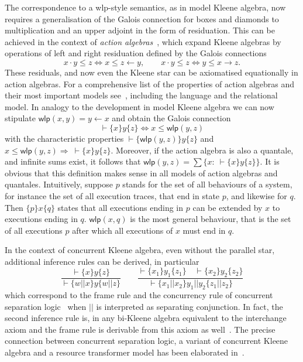 \documentclass{llncs}
\newcommand{\wlp}{\mathsf{wlp}}
\begin{document}
The correspondence to a wlp-style semantics, as in model Kleene
algebra, now requires a generalisation of the Galois connection for
boxes and diamonds to multiplication and an upper adjoint in the form
of residuation.  This can be achieved in the context of \emph{action
  algebras}~\cite{pratt_action_1990}, which expand Kleene algebras by operations
of left and right residuation defined by the Galois connections
\begin{equation*}
  x\cdot y\le z\Leftrightarrow x\le z\leftarrow y,\qquad x\cdot y\le z \Leftrightarrow y\le x\rightarrow z.
\end{equation*}
These residuals, and now even the Kleene star can be axiomatised
equationally in action algebras. For a comprehensive list of the
properties of action algebras and their most important models
see~\cite{armstrong_kleene_2013}, including the language and the relational
model. In analogy to the development in model Kleene algebra we can
now stipulate $ \wlp(x,y)=y\leftarrow x$ and obtain the Galois
connection
\begin{equation*}
  \vdash \{x\}y\{z\} \Leftrightarrow x\le \wlp(y,z)
\end{equation*}
with the characteristic properties $\vdash \{\wlp(y,z)\}y\{z\}$ and $x\le
\wlp(y,z)\Rightarrow \ \vdash \{x\}y\{z\}$. Moreover, if the action algebra is
also a quantale, and infinite sums exist, it follows that $
\wlp(y,z)=\sum\{x:\ \vdash \{x\}y\{z\}\}$.  It is obvious that this definition
makes sense in all models of action algebras and
quantales. Intuitively, suppose $p$ stands for the set of all
behaviours of a system, for instance the set of all execution traces,
that end in state $p$, and likewise for $q$. Then $\{p\}x\{q\}$ states
that all executions ending in $p$ can be extended by $x$ to executions
ending in $q$. $\wlp(x,q)$ is the most general behaviour, that is the
set of all executions $p$ after which all executions of $x$ must end
in $q$.

In the context of concurrent Kleene algebra, even without the parallel
star, additional inference rules can be derived, in particular
\begin{equation*}
  \frac{\vdash\{x\}y\{z\}}{\vdash\{w||x\}y\{w||z\}}\qquad \frac{\vdash\{x_1\}y_1\{z_1\}\quad\vdash\{x_2\}y_2\{z_2\}}{\vdash\{x_1||x_2\}y_1||y_2\{z_1||z_2\}}
\end{equation*}
which correspond to the frame rule and the concurrency rule of
concurrent separation logic~\cite{} when $||$ is interpreted as
separating conjunction. In fact, the second inference rule is, in any
bi-Kleene algebra equivalent to the interchange axiom and the frame
rule is derivable from this axiom as well~\cite{hoare_concurrent_2011}. The
precise connection between concurrent separation logic, a variant of
concurrent Kleene algebra and a resource transformer model has been
elaborated in~\cite{hoare_locality_2011}.
\end{document}

